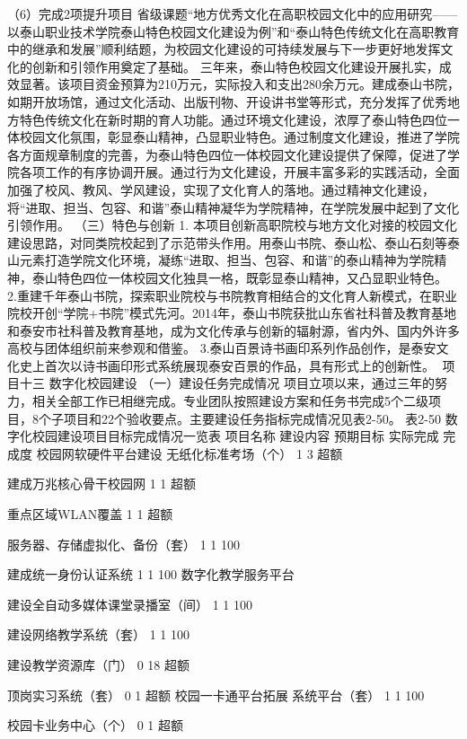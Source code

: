（6）完成2项提升项目
省级课题“地方优秀文化在高职校园文化中的应用研究——以泰山职业技术学院泰山特色校园文化建设为例”和“泰山特色传统文化在高职教育中的继承和发展”顺利结题，为校园文化建设的可持续发展与下一步更好地发挥文化的创新和引领作用奠定了基础。
三年来，泰山特色校园文化建设开展扎实，成效显著。该项目资金预算为210万元，实际投入和支出280余万元。建成泰山书院，如期开放场馆，通过文化活动、出版刊物、开设讲书堂等形式，充分发挥了优秀地方特色传统文化在新时期的育人功能。通过环境文化建设，浓厚了泰山特色四位一体校园文化氛围，彰显泰山精神，凸显职业特色。通过制度文化建设，推进了学院各方面规章制度的完善，为泰山特色四位一体校园文化建设提供了保障，促进了学院各项工作的有序协调开展。通过行为文化建设，开展丰富多彩的实践活动，全面加强了校风、教风、学风建设，实现了文化育人的落地。通过精神文化建设，将“进取、担当、包容、和谐”泰山精神凝华为学院精神，在学院发展中起到了文化引领作用。
（三）特色与创新
1. 本项目创新高职院校与地方文化对接的校园文化建设思路，对同类院校起到了示范带头作用。用泰山书院、泰山松、泰山石刻等泰山元素打造学院文化环境，凝练“进取、担当、包容、和谐”的泰山精神为学院精神，泰山特色四位一体校园文化独具一格，既彰显泰山精神，又凸显职业特色。
2.重建千年泰山书院，探索职业院校与书院教育相结合的文化育人新模式，在职业院校开创“学院+书院”模式先河。2014年，泰山书院获批山东省社科普及教育基地和泰安市社科普及教育基地，成为文化传承与创新的辐射源，省内外、国内外许多高校与团体组织前来参观和借鉴。
3.泰山百景诗书画印系列作品创作，是泰安文化史上首次以诗书画印形式系统展现泰安百景的作品，具有形式上的创新性。

项目十三    数字化校园建设
（一）建设任务完成情况
项目立项以来，通过三年的努力，相关全部工作已相继完成。专业团队按照建设方案和任务书完成5个二级项目，8个子项目和22个验收要点。主要建设任务指标完成情况见表2-50。 
表2-50  数字化校园建设项目目标完成情况一览表
项目名称
建设内容
预期目标
实际完成
完成度
校园网软硬件平台建设
无纸化标准考场（个）
1
3
超额

建成万兆核心骨干校园网
1
1
超额

重点区域WLAN覆盖
1
1
超额

服务器、存储虚拟化、备份（套）
1
1
100%

建成统一身份认证系统
1
1
100%
数字化教学服务平台

建设全自动多媒体课堂录播室（间）
1
1
100%

建设网络教学系统（套）
1
1
100%

建设教学资源库（门）
0
18
超额

顶岗实习系统（套）
0
1
超额
校园一卡通平台拓展
系统平台（套）
1
1
100%

校园卡业务中心（个）
0
1
超额

